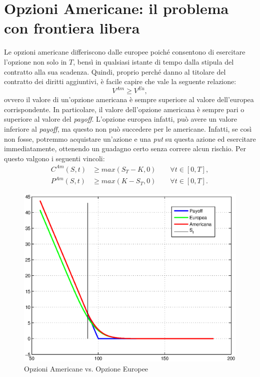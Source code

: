 \documentclass[a4paper,10pt]{report}
\theoremstyle{osservazione}
\theoremstyle{esempio}
\theoremstyle{notazione}
\theoremstyle{corollario}
\begin{document}
\section{Opzioni Americane: il problema con frontiera libera}
Le opzioni americane differiscono dalle europee poich\'e consentono di esercitare l'opzione non solo in $T$, bens\`i in qualsiasi istante di tempo dalla stipula del contratto alla sua scadenza. Quindi, proprio perch\'e danno al titolare del contratto dei diritti aggiuntivi, \`e facile capire che vale la seguente relazione: $$V^{Am}\geq V^{Eu},$$ ovvero il valore di un'opzione americana \`e sempre superiore al valore dell'europea corrispondente. In particolare, il valore dell'opzione americana \`e sempre pari o superiore al valore del \emph{payoff}. L'opzione europea infatti, pu\`o avere un valore inferiore al \emph{payoff}, ma questo non pu\`o succedere per le americane. Infatti, se cos\`i non fosse, potremmo acquistare un'azione e una \emph{put} su questa azione ed esercitare immediatamente, ottenendo un guadagno certo senza correre alcun rischio. Per questo valgono i seguenti vincoli:
\begin{align}
C^{Am}(S,t)&\geq max(S_T-K,0)\qquad\forall t\in[0,T],\\
P^{Am}(S,t)&\geq max(K-S_T,0)\qquad\forall t\in[0,T].
\label{putbound}
\end{align}
\begin{figure}[h!]
\begin{center}
\includegraphics[width=12cm]{img/putam.eps}
\caption{Opzioni Americane vs. Opzione Europee}
\label{putamfig}
\end{center}
\end{figure}
\end{document}
